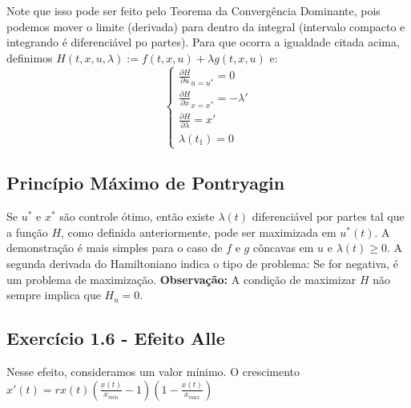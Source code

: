 Note que isso pode ser feito pelo Teorema da Convergência Dominante, pois podemos mover o limite (derivada) para dentro da integral (intervalo compacto e integrando é diferenciável po partes).  Para que ocorra a igualdade citada acima, definimos $H(t,x,u,\lambda) := f(t,x,u) + \lambda g(t,x,u)$ e:
\begin{equation}
\begin{cases}
    \frac{\partial H}{\partial u}_{u = u^{*}} = 0 \\
    \frac{\partial H}{\partial x}_{x = x^*} = - \lambda ' \\
    \frac{\partial H}{\partial \lambda} = x' \\
    \lambda(t_1) = 0 
\end{cases}    
\end{equation}

\subsection{Princípio Máximo de Pontryagin}

Se $u^*$ e $x^*$ são controle ótimo, então existe $\lambda (t)$ diferenciável por partes tal que a função $H$, como definida anteriormente, pode ser maximizada em $u^*(t)$. A demonstração é mais simples para o caso de $f$ e $g$ côncavas em $u$ e $\lambda (t) \geq 0$. A segunda derivada do Hamiltoniano indica o tipo de problema: Se for negativa, é um problema de maximização. 
\textbf{Observação:} A condição de maximizar $H$ não sempre implica que $H_u = 0$.  

\subsection{Exercício 1.6 - Efeito Alle}

Nesse efeito, consideramos um valor mínimo. O crescimento $x'(t) = rx(t)(\frac{x(t)}{x_{min}} - 1)(1 - \frac{x(t)}{x_{max}})$

